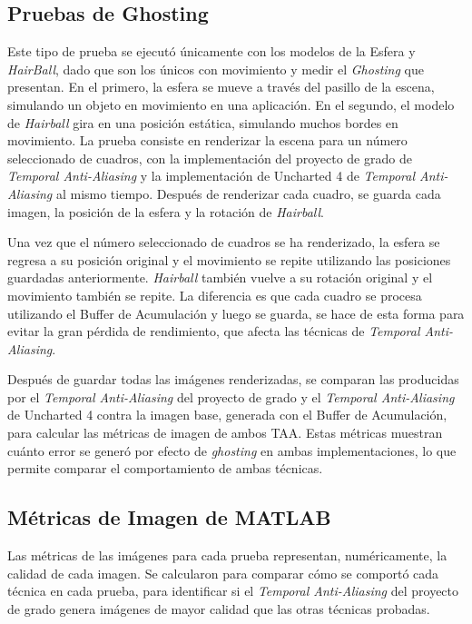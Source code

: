 \documentclass[pregrado]{tesis-usb} %
\begin{document}
\subsection{Pruebas de Ghosting}
Este tipo de prueba se ejecutó únicamente con los modelos de la Esfera y \textit{HairBall}, dado que son los únicos con movimiento y medir el \textit{Ghosting} que presentan. En el primero, la esfera se mueve a través del pasillo de la escena, simulando un objeto en movimiento en una aplicación. En el segundo, el modelo de \textit{Hairball} gira en una posición estática, simulando muchos bordes en movimiento. La prueba consiste en renderizar la escena para un número seleccionado de cuadros, con la implementación del proyecto de grado de \textit{Temporal Anti-Aliasing} y la implementación de Uncharted 4 de \textit{Temporal Anti-Aliasing} al mismo tiempo. Después de renderizar cada cuadro, se guarda cada imagen, la posición de la esfera y la rotación de \textit{Hairball}.

Una vez que el número seleccionado de cuadros se ha renderizado, la esfera se regresa a su posición original y el movimiento se repite utilizando las posiciones guardadas anteriormente. \textit{Hairball} también vuelve a su rotación original y el movimiento también se repite. La diferencia es que cada cuadro se procesa utilizando el Buffer de Acumulación y luego se guarda, se hace de esta forma para evitar la gran pérdida de rendimiento, que afecta las técnicas de \textit{Temporal Anti-Aliasing}.

Después de guardar todas las imágenes renderizadas, se comparan las producidas por el \textit{Temporal Anti-Aliasing} del proyecto de grado y el \textit{Temporal Anti-Aliasing} de Uncharted 4 contra la imagen base, generada con el Buffer de Acumulación, para calcular las métricas de imagen de ambos TAA. Estas métricas muestran cuánto error se generó por efecto de \textit{ghosting} en ambas implementaciones, lo que permite comparar el comportamiento de ambas técnicas. 


\subsection{Métricas de Imagen de MATLAB}
Las métricas de las imágenes para cada prueba representan, numéricamente, la calidad de cada imagen. Se calcularon para comparar cómo se comportó cada técnica en cada prueba, para identificar si el \textit{Temporal Anti-Aliasing} del proyecto de grado genera imágenes de mayor calidad que las otras técnicas probadas.
\end{document}
